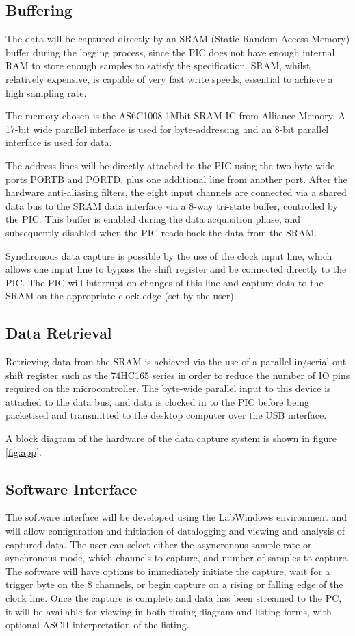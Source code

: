 \documentclass[11pt]{article}
\begin{document}
\subsection{Buffering}
    The data will be captured directly by an SRAM (Static Random Access Memory) buffer during the logging process, since the PIC does not have enough internal RAM to store enough samples to satisfy the specification. SRAM, whilst relatively expensive, is capable of very fast write speeds, essential to achieve a high sampling rate.

    The memory chosen is the AS6C1008 1Mbit SRAM IC from Alliance Memory. A 17-bit wide parallel interface is used for byte-addressing and an 8-bit parallel interface is used for data.

    The address lines will be directly attached to the PIC using the two byte-wide ports PORTB and PORTD, plus one additional line from another port. After the hardware anti-aliasing filters, the eight input channels are connected via a shared data bus to the SRAM data interface via a 8-way tri-state buffer, controlled by the PIC. This buffer is enabled during the data acquisition phase, and subsequently disabled when the PIC reads back the data from the SRAM.

    Synchronous data capture is possible by the use of the clock input line, which allows one input line to bypass the shift register and be connected directly to the PIC.  The PIC will interrupt on changes of this line and capture data to the SRAM on the appropriate clock edge (set by the user).

\subsection{Data Retrieval}
    Retrieving data from the SRAM is achieved via the use of a parallel-in/serial-out shift register such as the 74HC165 series in order to reduce the number of IO pins required on the microcontroller. The byte-wide parallel input to this device is attached to the data bus, and data is clocked in to the PIC before being packetised and transmitted to the desktop computer over the USB interface.

    A block diagram of the hardware of the data capture system is shown in figure \ref{fig:app}.
    
\subsection{Software Interface}
    The software interface will be developed using the LabWindows environment and will allow configuration and initiation of datalogging and viewing and analysis of captured data.  The user can select either the asyncronous sample rate or synchronous mode, which channels to capture, and number of samples to capture.  The software will have options to immediately initiate the capture, wait for a trigger byte on the 8 channels, or begin capture on a rising or falling edge of the clock line.  Once the capture is complete and data has been streamed to the PC, it will be available for viewing in both timing diagram and listing forms, with optional ASCII interpretation of the listing.
\end{document}
